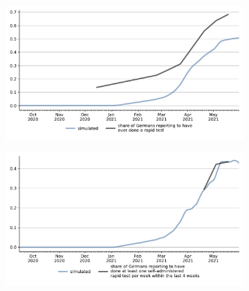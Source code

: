 




\begin{figure}[ht]
    \centering
    \caption{Share of Individuals With Rapid Tests}
    \label{fig:share_ever_rapid_test}
    \begin{subfigure}{.55\textwidth}
        \includegraphics[width=0.9 \textwidth]{../figures/results/figures/scenario_comparisons/combined_fit/full_share_ever_rapid_test}
    \end{subfigure}%
    \begin{subfigure}{.55\textwidth}
        \includegraphics[width=0.9 \textwidth]{../figures/results/figures/scenario_comparisons/combined_fit/full_share_rapid_test_in_last_week}
    \end{subfigure}
    \label{fig:share_rapid_test_last_week}
\end{figure}
